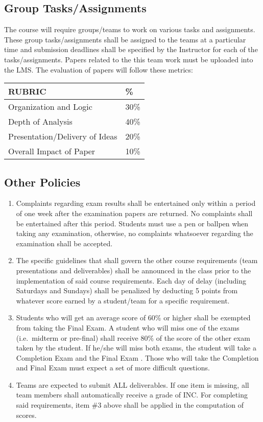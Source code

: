 \hypertarget{group-tasksassignments}{%
\subsection{Group Tasks/Assignments}\label{group-tasksassignments}}

The course will require groups/teams to work on various tasks and
assignments. These group tasks/assignments shall be assigned to the
teams at a particular time and submission deadlines shall be specified
by the Instructor for each of the tasks/assignments. Papers related to
the this team work must be uploaded into the LMS. The evaluation of
papers will follow these metrics:

\begin{longtable}[]{@{}ll@{}}
\toprule
RUBRIC & \%\tabularnewline
\midrule
\endhead
Organization and Logic & 30\%\tabularnewline
Depth of Analysis & 40\%\tabularnewline
Presentation/Delivery of Ideas & 20\%\tabularnewline
Overall Impact of Paper & 10\%\tabularnewline
\bottomrule
\end{longtable}

\hypertarget{other-policies}{%
\subsection{Other Policies}\label{other-policies}}

\begin{enumerate}
\def\labelenumi{\arabic{enumi}.}
\tightlist
\item
  Complaints regarding exam results shall be entertained only within a
  period of one week after the examination papers are returned. No
  complaints shall be entertained after this period. Students must use a
  pen or ballpen when taking any examination, otherwise, no complaints
  whatsoever regarding the examination shall be accepted.
\item
  The specific guidelines that shall govern the other course
  requirements (team presentations and deliverables) shall be announced
  in the class prior to the implementation of said course requirements.
  Each day of delay (including Saturdays and Sundays) shall be penalized
  by deducting 5 points from whatever score earned by a student/team for
  a specific requirement.
\item
  Students who will get an average score of 60\% or higher shall be
  exempted from taking the Final Exam. A student who will miss one of
  the exams (i.e.~midterm or pre-final) shall receive 80\% of the score
  of the other exam taken by the student. If he/she will miss both
  exams, the student will take a Completion Exam and the Final Exam
 . Those who will take the Completion and Final Exam
  must expect a set of more difficult questions.
\item
  Teams are expected to submit ALL deliverables. If one item is missing,
  all team members shall automatically receive a grade of INC. For
  completing said requirements, item \#3 above shall be applied in the
  computation of scores.
\end{enumerate}

